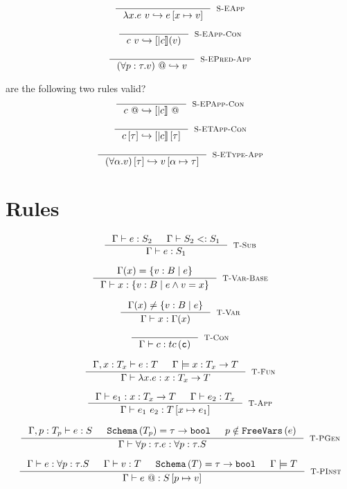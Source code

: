 \documentclass[10pt,a4paper]{article}
\makeatletter
\newcommand\highlight[2]{{\setlength\fboxsep{1pt}\colorbox{#1}{#2}}}
\def\NV{\highlight{colorNV}}
\newcommand\vref{\ensuremath{v}}
\newcommand\tref[2]{\ensuremath{\left\lbrace \vref : #1\mid #2\right\rbrace}}
\newcommand\tbbool{\ensuremath{\texttt{bool}}}
\newcommand\tc[1]{\ensuremath{tc\left(\texttt{#1}\right)}}
\newcommand\tfun[3]{\ensuremath{#1 : #2 \rightarrow #3}}
\newcommand\tpabs[3]{\ensuremath{\forall #1 : #2 . #3}}
\newcommand\etabs[2]{\ensuremath{\forall #1 . #2}}
\newcommand\epabs[3]{\ensuremath{\forall #1 : #2 . #3}}
\newcommand\efun[2]{\ensuremath{\lambda #1 . #2}}
\newcommand\eapp[2]{\ensuremath{{#1} \ {#2}}}
\newcommand\etapp[2]{\ensuremath{{#1} \left[ {#2}\right]}}
\newcommand\epapp[1]{\ensuremath{{#1} \ @}}
\newcommand\tapp{\rulename{T-App}}
\newcommand\tsub{\rulename{T-Sub}}
\newcommand\tcon{\rulename{T-Con}}
\newcommand\tpinst{\rulename{T-PInst}}
\newcommand\tpgen{\rulename{T-PGen}}
\newcommand\isWellFormed[2]{\ensuremath{{#1}\models {#2}}}
\newcommand\isSub[3]{\ensuremath{{#1}\vdash {#2}<:{#3}}}
\newcommand\hastype[3]{\ensuremath{{#1}\vdash {#2}:{#3}}}
\newcommand\eval[2]{\ensuremath{{#1}\hookrightarrow {#2}}}
\newcommand\rulename[1]{\textsc{#1}}
\newcommand\sch[1]{\ensuremath{\texttt{Schema}\left(#1\right)}}
\newcommand\fv[1]{\ensuremath{\texttt{FreeVars}\left(#1\right)}}
\newcommand\sub[2]{\ensuremath{\left[ #1 \mapsto #2 \right]}}
\makeatother
\begin{document}
$$
\inference{
}{
	\eval{\eapp{\efun{x}{e}}{v}}{e\sub{x}{v}}
}[\rulename{S-EApp}]
$$

$$
\inference{
}{
	\eval{\eapp{c}{v}}{[|c|](v)}
}[\rulename{S-EApp-Con}]
$$

$$
\inference{
}{
	\eval{\epapp{(\epabs{p}{\tau}{v})}}{v}
}[\rulename{S-EPred-App}]
$$

\NV{are the following two rules valid?}
$$
\inference{
}{
	\eval{\epapp{c}}{\epapp{[|c|]}}
}[\rulename{S-EPApp-Con}]
$$

$$
\inference{
}{
	\eval{\etapp{c}{\tau}}{\etapp{[|c|]}{\tau}}
}[\rulename{S-ETApp-Con}]
$$

$$
\inference{
}{
	\eval{\etapp{(\etabs{\alpha}{v})}{\tau}}{v\sub{\alpha}{\tau}}
}[\rulename{S-EType-App}]
$$


\section*{Rules}
\hfill\fbox{\hastype{\Gamma}{e}{S}}

$$
\inference{
	\hastype{\Gamma}{e}{S_2} && \isSub{\Gamma}{S_2}{S_1}
}{
	\hastype{\Gamma}{e}{S_1}
}[\tsub]
$$

$$
\inference{
	\Gamma(x) = \tref{B}{e}
}{
	\hastype{\Gamma}{x}{\tref{B}{e \land \vref = x}}
}[\rulename{T-Var-Base}]
$$

$$
\inference{
	\Gamma(x) \neq \tref{B}{e}
}{
	\hastype{\Gamma}{x}{\Gamma(x)}
}[\rulename{T-Var}]
$$

$$
\inference{
}{
	\hastype{\Gamma}{c}{\tc{c}}
}[\tcon]
$$

$$
\inference{
	\hastype{\Gamma, x : T_x}{e}{T} && \isWellFormed{\Gamma}{\tfun{x}{T_x}{T}}
}{
	\hastype{\Gamma}{\efun{x}{e}}{\tfun{x}{T_x}{T}}
}[\rulename{T-Fun}]
$$

$$\label{tapp}
\inference{
	\hastype{\Gamma}{e_1}{\tfun{x}{T_x}{T}} && 
	\hastype{\Gamma}{e_2}{T_x}
}{
	\hastype{\Gamma}{\eapp{e_1}{e_2}}{T\sub{x}{e_1}}
}[\tapp]
$$

$$
\inference{
	\hastype{\Gamma, p:T_p}{e}{S} && 
	\sch{T_p} = \tau \rightarrow \tbbool &&
	p \notin \fv{e}
}{
	\hastype{\Gamma}{\epabs{p}{\tau}{e}}{\tpabs{p}{\tau}{S}}
}[\tpgen]
$$

$$
\inference{
	\hastype{\Gamma}{e}{\tpabs{p}{\tau}{S}} && 
	\hastype{\Gamma}{v}{T} && \sch{T} = \tau \rightarrow \tbbool &&
	\isWellFormed{\Gamma}{T}
}{
	\hastype{\Gamma}{\epapp{e}}{S\sub{p}{v}}
}[\tpinst]
$$
\end{document}
